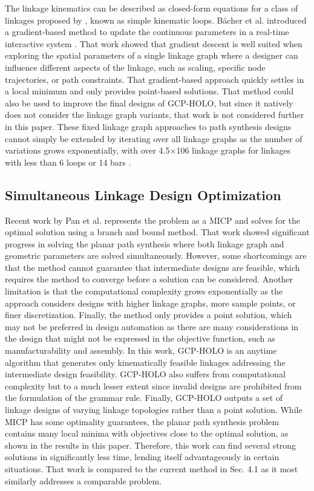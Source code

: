 The linkage kinematics can be described as closed-form equations for a class of linkages proposed by  \cite{bacher_linkedit_2015}, known as simple kinematic loops. Bächer et al. introduced a gradient-based method to update the continuous parameters in a real-time interactive system \cite{bacher_linkedit_2015}. That work showed that gradient descent is well suited when exploring the spatial parameters of a single linkage graph where a designer can influence different aspects of the linkage, such as scaling, specific node trajectories, or path constraints. That gradient-based approach quickly settles in a local minimum and only provides point-based solutions. That method could also be used to improve the final designs of GCP-HOLO, but since it natively does not consider the linkage graph variants, that work is not considered further in this paper. These fixed linkage graph approaches to path synthesis designs cannot simply be extended by iterating over all linkage graphs as the number of variations grows exponentially, with over 4.5×106 linkage graphs for linkages with less than 6 loops or 14 bars \cite{tuttle_generation_1996}.

\subsection{Simultaneous Linkage Design Optimization}
Recent work by Pan et al. \cite{pan_joint_2022} represents the problem as a MICP and solves for the optimal solution using a branch and bound method. That work showed significant progress in solving the planar path synthesis where both linkage graph and geometric parameters are solved simultaneously. However, some shortcomings are that the method cannot guarantee that intermediate designs are feasible, which requires the method to converge before a solution can be considered. Another limitation is that the computational complexity grows exponentially as the approach considers designs with higher linkage graphs, more sample points, or finer discretization. Finally, the method only provides a point solution, which may not be preferred in design automation as there are many considerations in the design that might not be expressed in the objective function, such as manufacturability and assembly. In this work, GCP-HOLO is an anytime algorithm that generates only kinematically feasible linkages addressing the intermediate design feasibility. GCP-HOLO also suffers from computational complexity but to a much lesser extent since invalid designs are prohibited from the formulation of the grammar rule. Finally, GCP-HOLO outputs a set of linkage designs of varying linkage topologies rather than a point solution. While MICP has some optimality guarantees, the planar path synthesis problem contains many local minima with objectives close to the optimal solution, as shown in the results in this paper. Therefore, this work can find several strong solutions in significantly less time, lending itself advantageously in certain situations. That work is compared to the current method in Sec. 4.1 as it most similarly addresses a comparable problem. 

